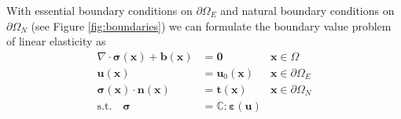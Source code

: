 With essential boundary conditions on $\partial \Omega_E$ and natural boundary conditions on $\partial \Omega_N$ (see Figure \ref{fig:boundaries}) we can formulate the boundary value problem of linear elasticity as 
\begin{align}
    \nabla \cdot \pmb{\sigma}(\mathbf{x}) + \mathbf{b}(\mathbf{x}) &= \mathbf{0} 
        &\mathbf{x} \in \Omega \\
    \mathbf{u}(\mathbf{x}) 
    &= \mathbf{u}_0 (\mathbf{x}) 
        &\mathbf{x} \in \partial \Omega_E \\
    \pmb{\sigma}(\mathbf{x}) \cdot \mathbf{n}(\mathbf{x}) 
    &= \mathbf{t} (\mathbf{x}) 
        &\mathbf{x} \in \partial \Omega_N\\
    \textrm{s.t.} \quad \pmb{\sigma} &= \mathbb{C} : \pmb{\varepsilon}(\mathbf{u})
\end{align}
